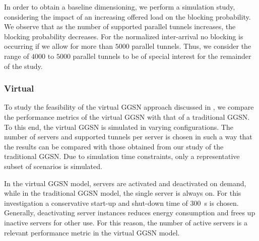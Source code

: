 In order to obtain a baseline dimensioning, we perform a simulation study, considering the impact of an increasing offered load on the blocking probability.
We observe that as the number of supported parallel tunnels increases, the blocking probability decreases.
For the normalized inter-arrival no blocking is occurring if we allow for more than \(5000\) parallel tunnels.
Thus, we consider the range of \(4000\) to \(5000\) parallel tunnels to be of special interest for the remainder of the study.

\subsubsection*{Virtual }\label{sec:cloud:virtualized_network_functions:performance_evaluation:virtual_ggsn}

To study the feasibility of the virtual \gls{GGSN} approach discussed in , we compare the performance metrics of the virtual \gls{GGSN} with that of a traditional \gls{GGSN}.
To this end, the virtual \gls{GGSN} is simulated in varying configurations.
The number of servers and supported tunnels per server is chosen in such a way that the results can be compared with those obtained from our study of the traditional \gls{GGSN}.
Due to simulation time constraints, only a representative subset of scenarios is simulated.

In the virtual \gls{GGSN} model, servers are activated and deactivated on demand, while in the traditional \gls{GGSN} model, the single server is always on.
For this investigation a conservative start-up and shut-down time of \SI{300}{\second} is chosen.
Generally, deactivating server instances reduces energy consumption and frees up inactive servers for other use.
For this reason, the number of active servers is a relevant performance metric in the virtual \gls{GGSN} model.

